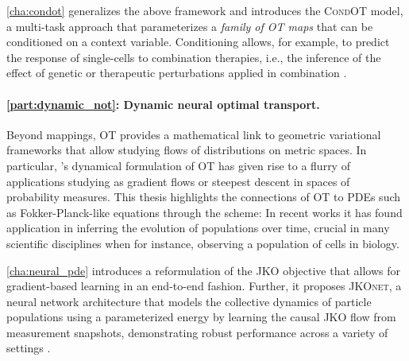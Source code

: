 \cref{cha:condot} generalizes the above framework and introduces the \textsc{CondOT} model, a multi-task approach that parameterizes a \emph{family of OT maps} that can be conditioned on a context variable. Conditioning allows, for example, to predict the response of single-cells to combination therapies, i.e., the inference of the effect of genetic or therapeutic perturbations applied in combination \citep{bunne2022supervised}. \\
	


\paragraph{\cref{part:dynamic_not}: Dynamic neural optimal transport.}

Beyond mappings, OT provides a mathematical link to geometric variational frameworks that allow studying flows of distributions on metric spaces.
In particular, \citeauthor{brenier1987decomposition}'s dynamical formulation of OT has given rise to a flurry of applications studying  as gradient flows or steepest descent in spaces of probability measures.
This thesis highlights the connections of OT to PDEs such as Fokker-Planck-like equations through the \citeauthor*{jordan1998variational} scheme: In recent works \citep{bunne2022proximal, alvarez2021optimizing, mokrov2021large, benamou2016augmented} 
it has found application in inferring the evolution of populations over time, crucial in many scientific disciplines when for instance, observing a population of cells in biology.

\cref{cha:neural_pde} introduces a reformulation of the JKO objective that allows for gradient-based learning in an end-to-end fashion. Further, it proposes \textsc{JKOnet}, a neural network architecture that models the collective dynamics of particle populations using a parameterized energy by learning the causal JKO flow from measurement snapshots,
demonstrating robust performance across a variety of settings \citep{bunne2022proximal}.

